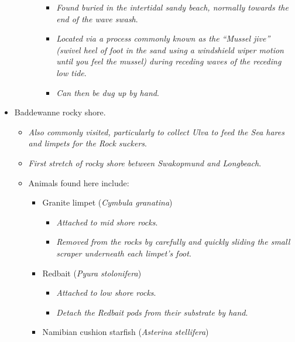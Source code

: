 \documentclass[
  letterpaper,
  DIV=11,
  numbers=noendperiod]{scrreprt}
\providecommand{\tightlist}{%
  \setlength{\itemsep}{0pt}\setlength{\parskip}{0pt}}\usepackage{longtable,booktabs,array}
\begin{document}
\begin{itemize}
\begin{itemize}
\begin{itemize}
      \begin{itemize}
      \tightlist
      \item
        \emph{Found buried in the intertidal sandy beach, normally
        towards the end of the wave swash}.
      \item
        \emph{Located via a process commonly known as the ``Mussel
        jive'' (swivel heel of foot in the sand using a windshield wiper
        motion until you feel the mussel) during receding waves of the
        receding low tide}.
      \item
        \emph{Can then be dug up by hand}.
      \end{itemize}
    \end{itemize}
  \end{itemize}
\item
  Baddewanne rocky shore.

  \begin{itemize}
  \tightlist
  \item
    \emph{Also commonly visited, particularly to collect Ulva to feed
    the Sea hares and limpets for the Rock suckers}.
  \item
    \emph{First stretch of rocky shore between Swakopmund and
    Longbeach}.
  \item
    Animals found here include:

    \begin{itemize}
    \tightlist
    \item
      Granite limpet (\emph{Cymbula granatina})

      \begin{itemize}
      \tightlist
      \item
        \emph{Attached to mid shore rocks}.
      \item
        \emph{Removed from the rocks by carefully and quickly sliding
        the small scraper underneath each limpet's foot}.
      \end{itemize}
    \item
      Redbait (\emph{Pyura stolonifera})

      \begin{itemize}
      \tightlist
      \item
        \emph{Attached to low shore rocks}.
      \item
        \emph{Detach the Redbait pods from their substrate by hand}.
      \end{itemize}
    \item
      Namibian cushion starfish (\emph{Asterina stellifera})


\end{itemize}
\end{itemize}
\end{itemize}
\end{document}
